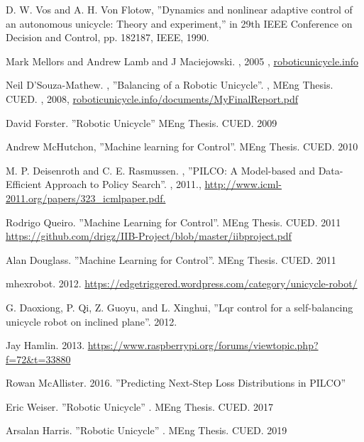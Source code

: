 \documentclass[twoside,twocolumn,12pt]{article}
\begin{document}
\begin{thebibliography}{56}
D. W. Vos and A. H. Von Flotow, ''Dynamics and nonlinear adaptive control of an
autonomous unicycle: Theory and experiment,'' in 29th IEEE Conference on Decision
and Control, pp. 182{187, IEEE, 1990.}

Mark Mellors and Andrew Lamb and J Maciejowski. ,
 2005 ,
 \url{roboticunicycle.info} 
 
Neil D'Souza-Mathew. ,
 ''Balancing of a Robotic Unicycle''. ,
 MEng Thesis. CUED. ,
 2008,
  \url{roboticunicycle.info/documents/MyFinalReport.pdf}


David Forster. ''Robotic Unicycle'' MEng Thesis. CUED. 2009

Andrew McHutchon, ''Machine learning for Control''. MEng Thesis. CUED. 2010

M. P. Deisenroth and C. E. Rasmussen. , ''PILCO: A Model-based and Data-Efficient Approach to Policy Search''. ,
2011.,
 \url{http://www.icml-2011.org/papers/323_icmlpaper.pdf.}


Rodrigo Queiro. ''Machine Learning for Control''. MEng Thesis. CUED. 2011
\url{https://github.com/drigz/IIB-Project/blob/master/iibproject.pdf}

Alan Douglass. ''Machine Learning for Control''. MEng Thesis. CUED. 2011

mhexrobot. 2012. \url{https://edgetriggered.wordpress.com/category/unicycle-robot/}

G. Daoxiong, P. Qi, Z. Guoyu, and L. Xinghui, ''Lqr control for a self-balancing unicycle
robot on inclined plane''. 2012.

Jay Hamlin. 2013. \url{https://www.raspberrypi.org/forums/viewtopic.php?f=72&t=33880}
 
Rowan McAllister. 2016. ''Predicting Next-Step Loss Distributions in PILCO''

Eric Weiser. ''Robotic Unicycle'' . MEng Thesis. CUED. 2017

Arsalan Harris. ''Robotic Unicycle'' . MEng Thesis. CUED. 2019
 

\end{thebibliography}
\end{document}

